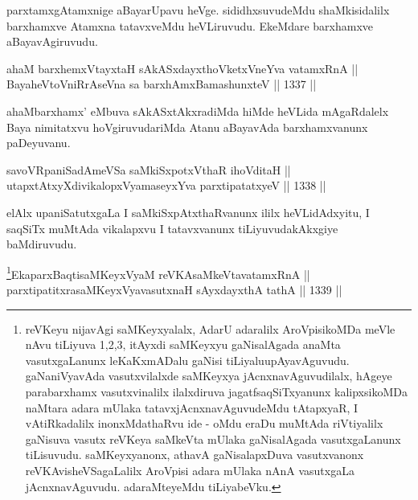 \begin{artha}
parxtamxgAtamxnige aBayarUpavu heVge. sididhxsuvudeMdu shaMkisidalilx barxhamxve Atamxna tatavxveMdu heVLiruvudu. EkeMdare barxhamxve aBayavAgiruvudu.
\end{artha}

\begin{shl}
ahaM barxhemxVtayxtaH sAkASxdayxthoVketxVneYva vatamxRnA  || \\
BayaheVtoVniRrAseVna sa barxhAmxBamashunxteV \hfill || 1337 ||  
\end{shl}

\begin{artha}
ahaMbarxhamx' eMbuva sAkASxtAkxradiMda hiMde heVLida mAgaRdalelx Baya nimitatxvu hoVgiruvudariMda Atanu aBayavAda barxhamxvanunx paDeyuvanu.
\end{artha}


\begin{shl}
savoVRpaniSadAmeVSa saMkiSxpotxV\s thaR ihoVditaH || \\
utapxtAtxyXdivikalopxV\s yamaseyxYva parxtipatatxyeV \hfill || 1338 ||  
\end{shl}

\begin{artha}
elAlx upaniSatutxgaLa I saMkiSxpAtxthaRvanunx ililx heVLidAdxyitu, I saqSiTx muMtAda vikalapxvu I tatavxvanunx tiLiyuvudakAkxgiye baMdiruvudu.
\end{artha}



\begin{shl}
\footnote{reVKeyu nijavAgi saMKeyxyalalx, AdarU adaralilx AroVpisikoMDa meVle nAvu tiLiyuva 1,2,3, itAyxdi saMKeyxyu gaNisalAgada anaMta vasutxgaLanunx leKaKxmADalu gaNisi tiLiyalu\break upAyavAguvudu. gaNaniVyavAda vasutxvilalxde saMKeyxya jAcnxnavAguvudilalx, hAgeye parabarxhamx vasutxvinalilx ilalxdiruva jagatfsaqSiTxyanunx kalipxsikoMDa naMtara adara mUlaka tatavxjAcnxnavAguvudeMdu tAtapxyaR, I vAtiRkadalilx inonxMdathaRvu ide - oMdu eraDu muMtAda riVtiyalilx gaNisuva vasutx reVKeya saMkeVta mUlaka gaNisalAgada vasutxgaLanunx tiLisuvudu. saMKeyxyanonx, athavA gaNisalapxDuva vasutxvanonx reVKAvisheVSagaLalilx AroVpisi adara mUlaka nAnA vasutxgaLa jAcnxnavAguvudu. adaraMteyeMdu tiLiyabeVku.}EkaparxBaqtisaMKeyxVyaM reVKAsaMkeVtavatamxRnA || \\
parxtipatitxrasaMKeyxVyavasutxnaH sAyxdayxthA tathA \hfill || 1339 ||  
\end{shl}
				
